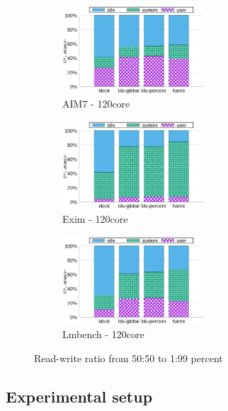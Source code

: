 \begin{figure}[tb]
    \centering
    \begin{subfigure}[b]{0.33\textwidth}
        \includegraphics[height=1.3in]{graph/aim7_cpuutils.eps}
        \caption{AIM7 - 120core}
    \end{subfigure}%
    \begin{subfigure}[b]{0.33\textwidth}
        \includegraphics[height=1.3in]{graph/exim_cpuutils.eps}
        \caption{Exim - 120core}
    \end{subfigure}
    \begin{subfigure}[b]{0.33\textwidth}
        \includegraphics[height=1.3in]{graph/lmbench_cpuutils.eps}
        \caption{Lmbench - 120core}
    \end{subfigure}
        \centering
    \caption{Read-write ratio from 50:50 to 1:99 percent}
    \label{fig:utilization}
    
\end{figure}



\subsection{Experimental setup}

